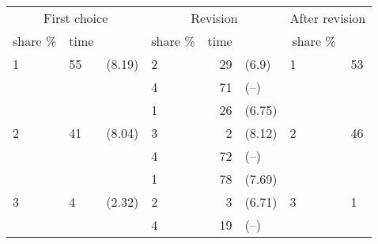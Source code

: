 
\begin{tabular}{llllrlll}
\toprule
\multicolumn{3}{c}{First choice} & \multicolumn{3}{c}{Revision} & \multicolumn{2}{c}{After revision} \\
\cmidrule(l{3pt}r{3pt}){1-3} \cmidrule(l{3pt}r{3pt}){4-6} \cmidrule(l{3pt}r{3pt}){7-8}
\multicolumn{1}{c}{share \%} & \multicolumn{1}{c}{time} & \multicolumn{1}{c}{} & \multicolumn{1}{c}{share \%} & \multicolumn{1}{c}{time} & \multicolumn{1}{c}{} & \multicolumn{1}{c}{share \%} \\
\cmidrule(l{3pt}r{3pt}){1-1} \cmidrule(l{3pt}r{3pt}){2-2} \cmidrule(l{3pt}r{3pt}){4-4} \cmidrule(l{3pt}r{3pt}){5-5} \cmidrule(l{3pt}r{3pt}){7-7}
1 & 55 & (8.19) & 2 & 29 & (6.9) & 1 & 53\\
 &  &  & 4 & 71 & (--) &  & \\
 &  &  & 1 & 26 & (6.75) &  & \\
2 & 41 & (8.04) & 3 & 2 & (8.12) & 2 & 46\\
 &  &  & 4 & 72 & (--) &  & \\
\addlinespace
 &  &  & 1 & 78 & (7.69) &  & \\
3 & 4 & (2.32) & 2 & 3 & (6.71) & 3 & 1\\
 &  &  & 4 & 19 & (--) &  & \\
\bottomrule
\end{tabular}
